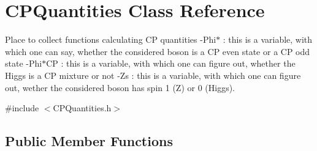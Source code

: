 \hypertarget{classCPQuantities}{
\section{CPQuantities Class Reference}
\label{classCPQuantities}
}


Place to collect functions calculating CP quantities -\/Phi$\ast$ : this is a variable, with which one can say, whether the considered boson is a CP even state or a CP odd state -\/Phi$\ast$CP : this is a variable, with which one can figure out, whether the Higgs is a CP mixture or not -\/Zs : this is a variable, with which one can figure out, wether the considered boson has spin 1 (Z) or 0 (Higgs).  


{\ttfamily \#include $<$CPQuantities.h$>$}\subsection*{Public Member Functions}
